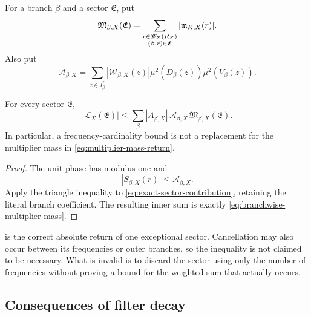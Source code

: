 \begin{definition}
\label{def:branchwise-multiplier-mass}
For a branch \(\beta\) and a sector \(\mathfrak E\), put
\begin{equation}
 \mathfrak M_{\beta,X}(\mathfrak E)
 =
 \sum_{\substack{r\in\mathscr W_X(R_X)\\
                 (\beta,r)\in\mathfrak E}}
 |\mathfrak m_{K,X}(r)|.
\label{eq:branchwise-multiplier-mass}
\end{equation}
Also put
\begin{equation}
 \mathcal A_{\beta,X}
 =
 \sum_{z\in I_\beta^\ast}
 |\mathcal W_{\beta,X}(z)|
 \mu^2(\widetilde D_\beta(z))\mu^2(V_\beta(z)).
\label{eq:branch-absolute-mass}
\end{equation}
\end{definition}

\begin{theorem}
\label{thm:multiplier-mass-return}
For every sector \(\mathfrak E\),
\begin{equation}
 \boxed{
 |\mathcal L_X(\mathfrak E)|
 \le
 \sum_\beta
 |A_{\beta,X}|\,
 \mathcal A_{\beta,X}\,
 \mathfrak M_{\beta,X}(\mathfrak E).}
\label{eq:multiplier-mass-return}
\end{equation}
In particular, a frequency-cardinality bound is not a replacement
for the multiplier mass in
\eqref{eq:multiplier-mass-return}.
\end{theorem}

\begin{proof}
The unit phase has modulus one and
\[
 |S_{\beta,X}(r)|\le\mathcal A_{\beta,X}.
\]
Apply the triangle inequality to
\eqref{eq:exact-sector-contribution}, retaining the literal branch
coefficient.  The resulting inner sum is exactly
\eqref{eq:branchwise-multiplier-mass}.
\end{proof}

\begin{remark}
 is the correct absolute return of
one exceptional sector.  Cancellation may also occur between its
frequencies or outer branches, so the inequality is not claimed to
be necessary.  What is invalid is to discard the sector using only
the number of frequencies without proving a bound for the weighted
sum that actually occurs.
\end{remark}

\subsection{Consequences of filter decay}

